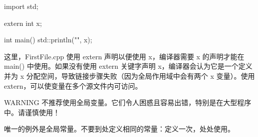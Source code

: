\begin{cpp}
import std;

extern int x;

int main()
{
    std::println("{}", x);
}
\end{cpp}

这里，FirstFile.cpp 使用 extern 声明以便使用 x，编译器需要 x 的声明才能在 main() 中使用。如果没有使用 extern 关键字声明 x，编译器会认为它是一个定义并为 x 分配空间，导致链接步骤失败（因为全局作用域中会有两个 x 变量）。使用 extern，可以使变量在多个源文件内可访问。

\begin{myWarning}{WARNING}
不推荐使用全局变量。它们令人困惑且容易出错，特别是在大型程序中。请谨慎使用！

唯一的例外是全局常量。不要到处定义相同的常量：定义一次，处处使用。
\end{myWarning}



